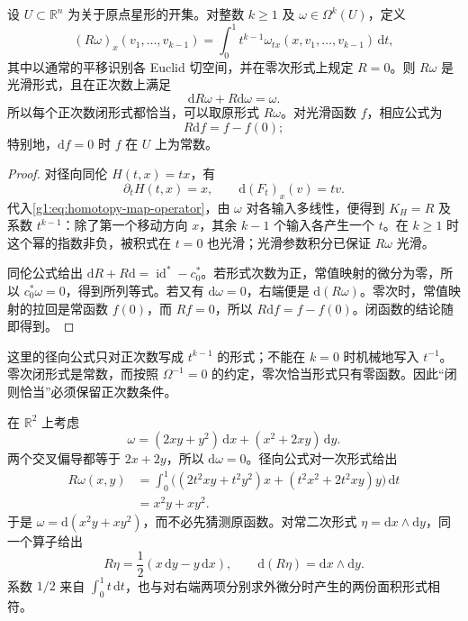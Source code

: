 \begin{theorem}[Poincaré 引理]
	\label{g1:thm:poincare-lemma}
	设 \(U\subset\mathbb R^n\) 为关于原点星形的开集。对整数 \(k\ge1\) 及 \(\omega\in\Omega^k(U)\)，定义
	\begin{equation}
		\label{g1:eq:radial-homotopy-operator}
		(R\omega)_x(v_1,\ldots,v_{k-1})
		=\int_0^1 t^{k-1}\omega_{tx}(x,v_1,\ldots,v_{k-1})\,\mathrm{d}t,
	\end{equation}
	其中以通常的平移识别各 Euclid 切空间，并在零次形式上规定 \(R=0\)。则 \(R\omega\) 是光滑形式，且在正次数上满足
	\[
		\mathrm{d}R\omega+R\mathrm{d}\omega=\omega.
	\]
	所以每个正次数闭形式都恰当，可以取原形式 \(R\omega\)。对光滑函数 \(f\)，相应公式为
	\[
		R\mathrm{d}f=f-f(0);
	\]
	特别地，\(\mathrm{d}f=0\) 时 \(f\) 在 \(U\) 上为常数。
\end{theorem}
\begin{proof}
	对径向同伦 \(H(t,x)=tx\)，有
	\[
		\partial_tH(t,x)=x,\qquad \mathrm{d}(F_t)_x(v)=tv.
	\]
	代入\eqref{g1:eq:homotopy-map-operator}，由 \(\omega\) 对各输入多线性，便得到 \(K_H=R\) 及系数 \(t^{k-1}\)：除了第一个移动方向 \(x\)，其余 \(k-1\) 个输入各产生一个 \(t\)。在 \(k\ge1\) 时这个幂的指数非负，被积式在 \(t=0\) 也光滑；光滑参数积分已保证 \(R\omega\) 光滑。

	同伦公式给出 \(\mathrm{d}R+R\mathrm{d}=\operatorname{id}^*-c_0^*\)。若形式次数为正，常值映射的微分为零，所以 \(c_0^*\omega=0\)，得到所列等式。若又有 \(\mathrm{d}\omega=0\)，右端便是 \(\mathrm{d}(R\omega)\)。零次时，常值映射的拉回是常函数 \(f(0)\)，而 \(Rf=0\)，所以 \(R\mathrm{d}f=f-f(0)\)。闭函数的结论随即得到。
\end{proof}

这里的径向公式只对正次数写成 \(t^{k-1}\) 的形式；不能在 \(k=0\) 时机械地写入 \(t^{-1}\)。零次闭形式是常数，而按照 \(\Omega^{-1}=0\) 的约定，零次恰当形式只有零函数。因此“闭则恰当”必须保留正次数条件。

\begin{example}
	\label{g1:exm:radial-primitive-computation}
	在 \(\mathbb R^2\) 上考虑
	\[
		\omega=(2xy+y^2)\,\mathrm{d}x+(x^2+2xy)\,\mathrm{d}y.
	\]
	两个交叉偏导都等于 \(2x+2y\)，所以 \(\mathrm{d}\omega=0\)。径向公式对一次形式给出
	\[
		\begin{aligned}
			R\omega(x,y)
			&=\int_0^1\bigl((2t^2xy+t^2y^2)x
			+(t^2x^2+2t^2xy)y\bigr)\,\mathrm{d}t\\
			&=x^2y+xy^2.
		\end{aligned}
	\]
	于是 \(\omega=\mathrm{d}(x^2y+xy^2)\)，而不必先猜测原函数。对常二次形式 \(\eta=\mathrm{d}x\wedge\mathrm{d}y\)，同一个算子给出
	\[
		R\eta=\frac12(x\,\mathrm{d}y-y\,\mathrm{d}x),\qquad
		\mathrm{d}(R\eta)=\mathrm{d}x\wedge\mathrm{d}y.
	\]
	系数 \(1/2\) 来自 \(\int_0^1t\,\mathrm{d}t\)，也与对右端两项分别求外微分时产生的两份面积形式相符。
\end{example}

